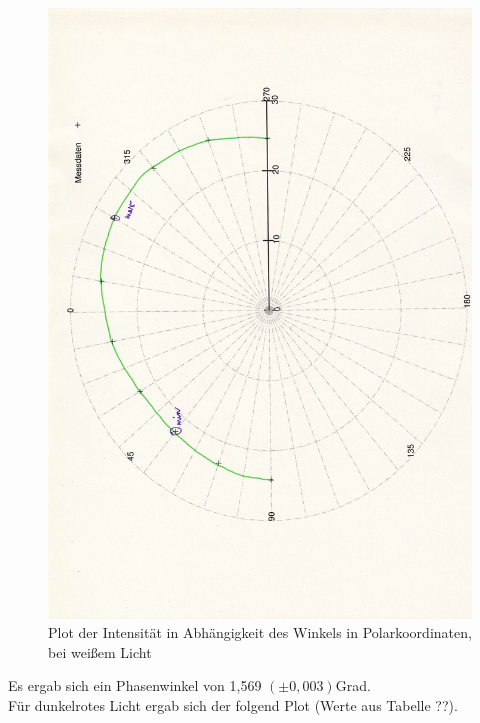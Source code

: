\documentclass[12pt]{scrartcl}
\begin{document}
\begin{figure}[H]
\centering
    \includegraphics[scale = 0.3, angle = -90]{a_5_w.pdf}
  	\caption[Plot der Intensität in Abhängigkeit des Winkels in Polarkoordinaten, bei weißem Licht]{Plot der Intensität in Abhängigkeit des Winkels in Polarkoordinaten, bei weißem Licht}
  \label{fig:a_5_w}
\end{figure}

Es ergab sich ein Phasenwinkel von 1,569 $(\pm 0,003)$Grad.\\

Für dunkelrotes Licht ergab sich der folgend Plot (Werte aus Tabelle ??).
\end{document}
